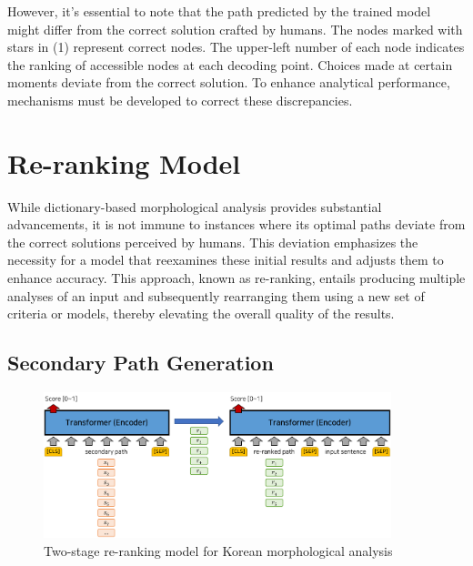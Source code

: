 \documentclass[AMS,STIX2COL]{WileyNJD-v2}
\begin{document}
    However, it's essential to note that the path predicted by the trained model might differ from the correct solution crafted by humans.
    The nodes marked with stars in (1) represent correct nodes.
    The upper-left number of each node indicates the ranking of accessible nodes at each decoding point.
    Choices made at certain moments deviate from the correct solution.
    To enhance analytical performance, mechanisms must be developed to correct these discrepancies.


    \section{Re-ranking Model}\label{sec:reranking-model}

    While dictionary-based morphological analysis provides substantial advancements, it is not immune to instances where its optimal paths deviate from the correct solutions perceived by humans.
    This deviation emphasizes the necessity for a model that reexamines these initial results and adjusts them to enhance accuracy.
    This approach, known as re-ranking, entails producing multiple analyses of an input and subsequently rearranging them using a new set of criteria or models, thereby elevating the overall quality of the results.

    \subsection{Secondary Path Generation}\label{subsec:secondary-path-generation}

    \begin{figure}[ht]
        \centerline{\includegraphics[width=0.9\textwidth]{fig;ranking-v2}}
        \caption{Two-stage re-ranking model for Korean morphological analysis}
        \label{fig:ranking}
    \end{figure}
\end{document}
